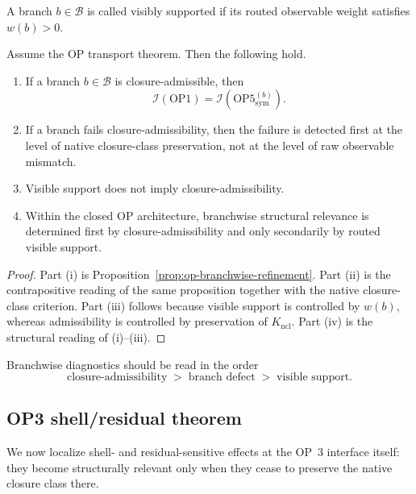 \begin{definition}
A branch $b\in\mathcal{B}$ is called visibly supported if its routed observable weight satisfies $w(b)>0$.
\end{definition}

\begin{theorem}\label{thm:admissible-branch}
Assume the OP transport theorem. Then the following hold.
\begin{enumerate}[leftmargin=2em,label=(\roman*)]
\item If a branch $b\in\mathcal{B}$ is closure-admissible, then
\[
\mathcal{I}(\mathrm{OP1})=\mathcal{I}(\mathrm{OP5}^{(b)}_{\mathrm{sym}}).
\]
\item If a branch fails closure-admissibility, then the failure is detected first at the level of native closure-class preservation, not at the level of raw observable mismatch.
\item Visible support does not imply closure-admissibility.
\item Within the closed OP architecture, branchwise structural relevance is determined first by closure-admissibility and only secondarily by routed visible support.
\end{enumerate}
\end{theorem}

\begin{proof}
Part (i) is Proposition~\ref{prop:op-branchwise-refinement}. Part (ii) is the contrapositive reading of the same proposition together with the native closure-class criterion. Part (iii) follows because visible support is controlled by $w(b)$, whereas admissibility is controlled by preservation of $K_{\mathrm{ncl}}$. Part (iv) is the structural reading of (i)--(iii).
\end{proof}

\begin{corollary}
Branchwise diagnostics should be read in the order
\[
\text{closure-admissibility}
\;>\;
\text{branch defect}
\;>\;
\text{visible support}.
\]
\end{corollary}

\subsection{OP3 shell/residual theorem}
\label{sec:op3-shell-theorem}

We now localize shell- and residual-sensitive effects at the OP~3 interface itself: they become structurally relevant only when they cease to preserve the native closure class there.

